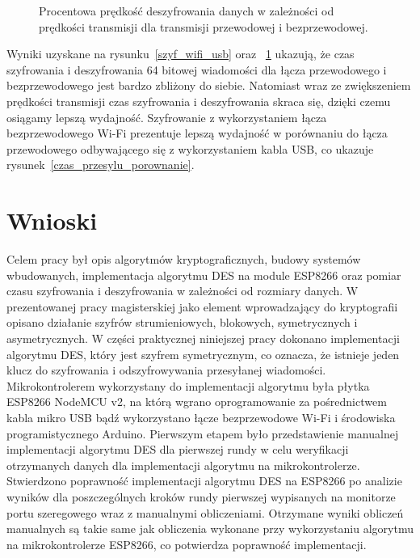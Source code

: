 \documentclass[12p]{article}
\begin{document}
\begin{figure}[H]
\centering
{}
\caption{Procentowa prędkość deszyfrowania danych w zależności od prędkości transmisji dla transmisji przewodowej i bezprzewodowej.}\label{deszyf_wifi_usb}
\end{figure}


Wyniki uzyskane na rysunku~\ref{szyf_wifi_usb} oraz ~\ref{deszyf_wifi_usb} ukazują, że czas szyfrowania i deszyfrowania 64 bitowej wiadomości dla łącza przewodowego i bezprzewodowego jest bardzo zbliżony do siebie. Natomiast wraz ze zwiększeniem prędkości transmisji czas szyfrowania i deszyfrowania skraca się, dzięki czemu osiągamy lepszą wydajność. Szyfrowanie z wykorzystaniem łącza bezprzewodowego Wi-Fi prezentuje lepszą wydajność w porównaniu do łącza przewodowego odbywającego się z wykorzystaniem kabla USB, co ukazuje rysunek~\ref{czas_przesylu_porownanie}. 

\newpage
\section{Wnioski}
\quad Celem pracy był opis algorytmów kryptograficznych, budowy systemów wbudowanych, implementacja algorytmu DES na module ESP8266 oraz pomiar czasu szyfrowania i deszyfrowania w zależności od rozmiary danych. W prezentowanej pracy magisterskiej jako element wprowadzający do kryptografii opisano działanie szyfrów strumieniowych, blokowych, symetrycznych i asymetrycznych. W części praktycznej niniejszej pracy dokonano implementacji algorytmu DES, który jest szyfrem symetrycznym, co oznacza, że istnieje jeden klucz do szyfrowania i odszyfrowywania przesyłanej wiadomości. Mikrokontrolerem wykorzystany do implementacji algorytmu była płytka ESP8266 NodeMCU v2, na którą wgrano oprogramowanie za pośrednictwem kabla mikro USB bądź wykorzystano łącze bezprzewodowe Wi-Fi i środowiska programistycznego Arduino. Pierwszym etapem było przedstawienie manualnej implementacji algorytmu DES dla pierwszej rundy w celu weryfikacji otrzymanych danych dla implementacji algorytmu na mikrokontrolerze. Stwierdzono poprawność implementacji algorytmu DES na ESP8266 po analizie wyników dla poszczególnych kroków rundy pierwszej wypisanych na monitorze portu szeregowego wraz z manualnymi obliczeniami. Otrzymane wyniki obliczeń manualnych są takie same jak obliczenia wykonane przy wykorzystaniu algorytmu na mikrokontrolerze ESP8266, co potwierdza poprawność implementacji.
 
\end{document}
